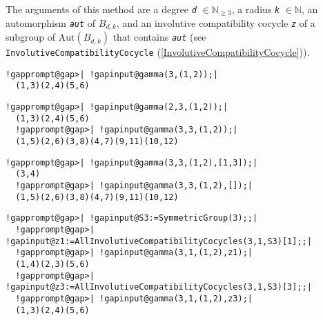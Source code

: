 \documentclass[a4paper,11pt]{report}
\begin{document}
{{{\begin{description}
 The arguments of this method are a degree \mbox{\texttt{\mdseries\slshape d}} $\in\mathbb{N}_{\ge 3}$, a radius \mbox{\texttt{\mdseries\slshape k}} $\in\mathbb{N}$, an automorphism \mbox{\texttt{\mdseries\slshape aut}} of $B_{d,k}$, and an involutive compatibility cocycle \mbox{\texttt{\mdseries\slshape z}} of a subgroup of $\mathrm{Aut}(B_{d,k})$ that contains \mbox{\texttt{\mdseries\slshape aut}} (see \texttt{InvolutiveCompatibilityCocycle} (\ref{InvolutiveCompatibilityCocycle})). 
\end{description}
 

 }

 

 
\begin{Verbatim}[commandchars=!@|,fontsize=\small,frame=single,label=Example]
  !gapprompt@gap>| !gapinput@gamma(3,(1,2));|
  (1,3)(2,4)(5,6)
\end{Verbatim}
 

 
\begin{Verbatim}[commandchars=!@|,fontsize=\small,frame=single,label=Example]
  !gapprompt@gap>| !gapinput@gamma(2,3,(1,2));|
  (1,3)(2,4)(5,6)
  !gapprompt@gap>| !gapinput@gamma(3,3,(1,2));|
  (1,5)(2,6)(3,8)(4,7)(9,11)(10,12)
\end{Verbatim}
 

 
\begin{Verbatim}[commandchars=!@|,fontsize=\small,frame=single,label=Example]
  !gapprompt@gap>| !gapinput@gamma(3,3,(1,2),[1,3]);|
  (3,4)
  !gapprompt@gap>| !gapinput@gamma(3,3,(1,2),[]);|
  (1,5)(2,6)(3,8)(4,7)(9,11)(10,12)
\end{Verbatim}
 

 
\begin{Verbatim}[commandchars=!@|,fontsize=\small,frame=single,label=Example]
  !gapprompt@gap>| !gapinput@S3:=SymmetricGroup(3);;|
  !gapprompt@gap>| !gapinput@z1:=AllInvolutiveCompatibilityCocycles(3,1,S3)[1];;|
  !gapprompt@gap>| !gapinput@gamma(3,1,(1,2),z1);|
  (1,4)(2,3)(5,6)
  !gapprompt@gap>| !gapinput@z3:=AllInvolutiveCompatibilityCocycles(3,1,S3)[3];;|
  !gapprompt@gap>| !gapinput@gamma(3,1,(1,2),z3);|
  (1,3)(2,4)(5,6)
\end{Verbatim}
 

 
}}
\end{document}
